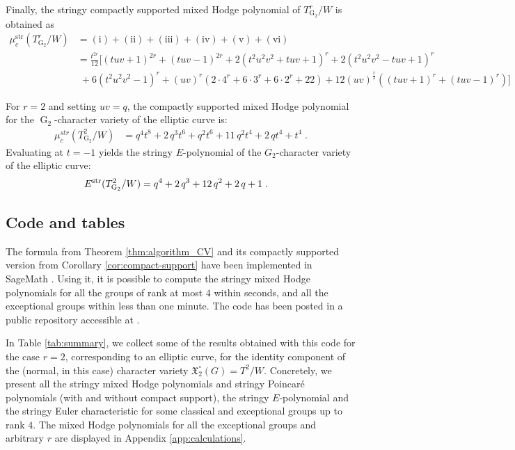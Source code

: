 \documentclass[11pt,english]{amsart}
\numberwithin{equation}{section}
\numberwithin{figure}{section}
\theoremstyle{plain}
\theoremstyle{plain}
\theoremstyle{definition}
\theoremstyle{remark}
\newcommand{\G}{\operatorname{G}}
\newcommand{\str}{\textup{str}}
\begin{document}
\vspace{-0.4cm}
Finally, the stringy compactly supported mixed Hodge polynomial of $T_{\G_2}^r/W$ is obtained as 
\vspace{-0.1cm}
 \begin{align*}
    \mu^{\mathrm{str}}_c(T_{\G_2}^r/W) &= (\textrm{i}) + (\textrm{ii}) + (\textrm{iii}) + (\textrm{iv}) + (\textrm{v}) + (\textrm{vi}) \\
    &= \frac{t^{2r}}{12} \bigg[ (tuv+1)^{2r} + (tuv-1)^{2r} + 2(t^2u^2v^2+tuv+1)^r + 2(t^2u^2v^2-tuv+1)^r \\
    & \; + 6(t^2u^2v^2-1)^r + (uv)^r \left( 2 \cdot 4^r + 6 \cdot 3^r +6 \cdot 2^{r} + 22 \right) + 12(uv)^{\frac{r}{2}} \left( (tuv+1)^r + (tuv-1)^r \right) \bigg]
\end{align*}

For $r=2$ and setting $uv=q$, the compactly supported mixed Hodge polynomial for the $\G_2$-character variety of the elliptic curve is:
\begin{align*}
\mu_c^{str}(T_{\G_2}^2/W) &= q^{4} t^{8} + 2 \, q^{3} t^{6} + q^{2} t^{6} + 11 \, q^{2} t^{4} + 2 \, q t^{4} + t^{4}\; .
\end{align*}
Evaluating at $t = -1$ yields the stringy $E$-polynomial of the $G_2$-character variety of the elliptic curve:
\begin{align*}
E^\str(T_{\G_2}^2/W) &= q^4 + 2\,q^3 + 12\,q^2 + 2\,q + 1\; .
\end{align*}



\subsection{Code and tables}

The formula from Theorem \ref{thm:algorithm_CV} and its compactly supported version from Corollary \ref{cor:compact-support} have been implemented in SageMath \cite{sagemath}. Using it, it is possible to compute the stringy mixed Hodge polynomials for all the groups of rank at most $4$ within seconds, and all the exceptional groups within less than one minute. The code has been posted in a public repository accessible at \cite{code_repository}.

In Table \ref{tab:summary}, we collect some of the results obtained with this code for the case $r = 2$, corresponding to an elliptic curve, for the identity component of the (normal, in this case) character variety $\mathfrak{X}_{2}^\circ(G) = T^2/W$. Concretely, we present all the stringy mixed Hodge polynomials and stringy Poincar\'e polynomials (with and without compact support), the stringy $E$-polynomial and the stringy Euler characteristic for some classical and exceptional groups up to rank $4$. The mixed Hodge polynomials for all the exceptional groups and arbitrary $r$ are displayed in Appendix \ref{app:calculations}.
\end{document}
